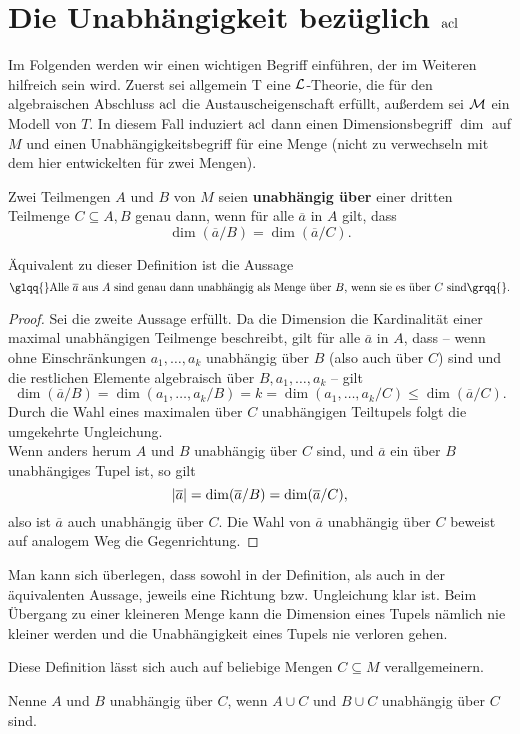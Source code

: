 \chapter{Die Unabhängigkeit bezüglich $\operatorname{acl}$}\label{Kapitel 0}
Im Folgenden werden wir einen wichtigen Begriff einführen, der im Weiteren hilfreich sein wird. Zuerst sei allgemein T eine $\mathcal{L}$-Theorie, die für den algebraischen Abschluss $\operatorname{acl}$ die Austauscheigenschaft erfüllt, außerdem sei $\mathcal{M}$ ein Modell von $T$. In diesem Fall induziert $\operatorname{acl}$ dann einen Dimensionsbegriff $\dim$ auf $M$ und einen Unabhängigkeitsbegriff für eine Menge (nicht zu verwechseln mit dem hier entwickelten für zwei Mengen).

\begin{definition}
	Zwei Teilmengen $A$ und $B$ von $M$ seien \textbf{unabhängig über} einer dritten Teilmenge $C\subseteq A,B$ genau dann, wenn für alle $\overline{a}$ in $A$ gilt, dass $$\dim(\overline{a}/B)=\dim(\overline{a}/C).$$
\end{definition}

\begin{lemma}
	Äquivalent zu dieser Definition ist die Aussage
	$$\glqq{}\text{Alle }\overline{a}\text{ aus }A\text{ sind genau dann unabhängig als Menge über }B\text{, wenn sie es über }C\text{ sind}\grqq{}.$$
\end{lemma}
\begin{proof}
	Sei die zweite Aussage erfüllt. Da die Dimension die Kardinalität einer maximal unabhängigen Teilmenge beschreibt, gilt für alle $\overline{a}$ in $A$, dass \--- wenn ohne Einschränkungen $a_1,\dots,a_k$ unabhängig über $B$ (also auch über $C$) sind und die restlichen Elemente algebraisch über $B,a_1,\dots,a_k$ \--- gilt $$\dim(\overline{a}/B)=\dim(a_1,\dots,a_k/B)=k=\dim(a_1,\dots,a_k/C)\leq\dim(\overline{a}/C).$$
	Durch die Wahl eines maximalen über $C$ unabhängigen Teiltupels folgt die umgekehrte Ungleichung.\\
	Wenn anders herum $A$ und $B$ unabhängig über $C$ sind, und $\overline{a}$ ein über $B$ unabhängiges Tupel ist, so gilt
	$${\left| \overline{a} \right|}=\dim(\overline{a}/B)=\dim(\overline{a}/C),$$
	also ist $\overline{a}$ auch unabhängig über $C$. Die Wahl von $\overline{a}$ unabhängig über $C$ beweist auf analogem Weg die Gegenrichtung.
\end{proof}

\begin{remark}
	Man kann sich überlegen, dass sowohl in der Definition, als auch in der äquivalenten Aussage, jeweils eine Richtung bzw. Ungleichung klar ist. Beim Übergang zu einer kleineren Menge kann die Dimension eines Tupels nämlich nie kleiner werden und die Unabhängigkeit eines Tupels nie verloren gehen.
\end{remark}
\newpage
Diese Definition lässt sich auch auf beliebige Mengen $C\subseteq M$ verallgemeinern.
\begin{definition}
	Nenne $A$ und $B$ unabhängig über $C$, wenn $A\cup C$ und $B\cup C$ unabhängig über $C$ sind.
\end{definition}

